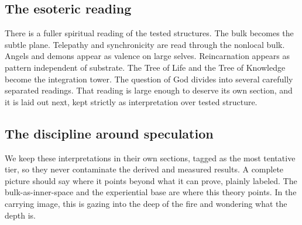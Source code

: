 \subsection{The esoteric reading}

There is a fuller spiritual reading of the tested structures. The bulk becomes the subtle plane. Telepathy and
synchronicity are read through the nonlocal bulk. Angels and demons appear as valence on large selves.
Reincarnation appears as pattern independent of substrate. The Tree of Life and the Tree of Knowledge become the
integration tower. The question of God divides into several carefully separated readings. That reading is large
enough to deserve its own section, and it is laid out next, kept strictly as interpretation over tested structure.

\subsection{The discipline around speculation}

We keep these interpretations in their own sections, tagged as the most tentative tier, so they never contaminate
the derived and measured results. A complete picture should say where it points beyond what it can prove, plainly
labeled. The bulk-as-inner-space and the experiential base are where this theory points. In the carrying image,
this is gazing into the deep of the fire and wondering what the depth is.

